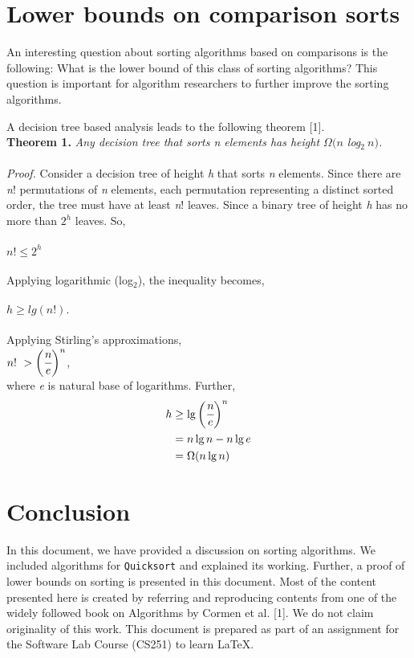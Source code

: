 \documentclass[a4paper, 10pt,twocolumn]{article}
\newcommand\fs[1][1cm]{\hspace*{#1}}
\begin{document}
\section{Lower bounds on comparison sorts}
An interesting question about sorting algorithms based on comparisons is the following: What is the lower
bound of this class of sorting algorithms? This question is important for algorithm researchers to further improve the sorting algorithms.

A decision tree based analysis leads to the following theorem [1].\\

\noindent\textbf{Theorem 1.} \textit{ Any decision tree that sorts n elements has height $\Omega(n$ log$_2\ n) $.} \\
\\
\textit{Proof.} Consider a decision tree of height \textit{h} that sorts \textit{n} elements. Since there are \textit{n}! permutations of \textit{n} elements, each permutation representing a distinct sorted order, the tree must have at least \textit{n}! leaves. Since a binary tree of height \textit{h} has no more than $2^h$ leaves. So,\\
\\
\fs[0.3cm]$n!\leq 2^h$\\
\\
Applying logarithmic (log$_2$), the inequality becomes,\\
\\
$h \geq lg(n!).$\\
\\
Applying Stirling’s approximations,\\

$n!\ > \bigg(\cfrac{n}{e}\bigg)^n$,\\

\noindent where \textit{e} is natural base of logarithms. Further,
\begin{align*}
    h &\geq \lg \bigg(\cfrac{n}{e}\bigg)^n\\
    &= n \lg n - n\lg e\\
    &= \Omega(n \lg n)
\end{align*}
\hfill\boxed{}

\section{Conclusion}
In this document, we have provided a discussion on sorting algorithms. We included algorithms for \texttt{Quicksort} and explained its working. Further, a proof of lower bounds on sorting is presented in this document. Most of the content presented here is created by referring and reproducing contents from one of the widely followed book on Algorithms by Cormen et al. [1]. We do not claim originality of
this work. This document is prepared as part of an assignment for the Software Lab Course (CS251) to learn \LaTeX.
\end{document}
